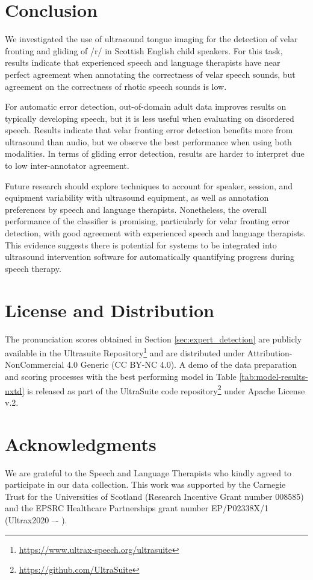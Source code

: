 \section{Conclusion}
\label{sec:conclusion}

We investigated the use of ultrasound tongue imaging for the detection of velar fronting and gliding of /r/ in Scottish English child speakers.
For this task, results indicate that experienced speech and language therapists have near perfect agreement when annotating the correctness of velar speech sounds, but agreement on the correctness of rhotic speech sounds is low.

For automatic error detection, out-of-domain adult data improves results on typically developing speech, but it is less useful when evaluating on disordered speech.
Results indicate that velar fronting error detection benefits more from ultrasound than audio, but we observe the best performance when using both modalities.
In terms of gliding error detection, results are harder to interpret due to low inter-annotator agreement.

Future research should explore techniques to account for speaker, session, and equipment variability with ultrasound equipment, as well as annotation preferences by speech and language therapists.
Nonetheless, the overall performance of the classifier is promising, particularly for velar fronting error detection, with good agreement with experienced speech and language therapists.
This evidence suggests there is potential for systems to be integrated into ultrasound intervention software for automatically quantifying progress during speech therapy.

\section{License and Distribution}

The pronunciation scores obtained in Section \ref{sec:expert_detection} are publicly available in the Ultrasuite Repository\footnote{\url{https://www.ultrax-speech.org/ultrasuite}} and are distributed under Attribution-NonCommercial 4.0 Generic (CC BY-NC 4.0).
A demo of the data preparation and scoring processes with the best performing model in Table \ref{tab:model-results-uxtd} is released as part of the UltraSuite code repository\footnote{\url{https://github.com/UltraSuite}} under Apache License v.2.

\section*{Acknowledgments}
We are grateful to the Speech and Language Therapists who kindly agreed to participate in our data collection.
This work was supported by the Carnegie Trust for the Universities of Scotland (Research Incentive Grant number 008585)
and the EPSRC Healthcare Partnerships grant number EP/P02338X/1 (Ultrax2020 –- \ultraxurl).



